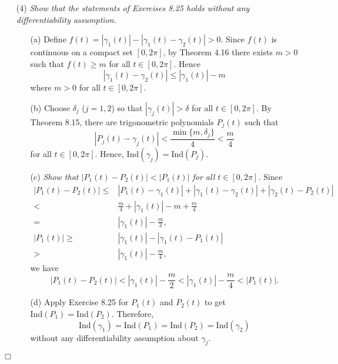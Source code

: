 \documentclass{article}
\begin{document}
\begin{enumerate}
\item[(4)]
\emph{Show that the statements of Exercises 8.25 holds
without any differentiability assumption.}
  \begin{enumerate}
  \item[(a)]
  Define $f(t) = |\gamma_1(t)| - |\gamma_1(t) - \gamma_2(t)| > 0$.
  Since $f(t)$ is continuous on a compact set $[0,2\pi]$,
  by Theorem 4.16 there exists $m > 0$ such that $f(t) \geq m$ for all $t \in [0,2\pi]$.
  Hence
  \[
    |\gamma_1(t) - \gamma_2(t)| \leq |\gamma_1(t)| - m
  \]
  where $m > 0$ for all $t \in [0,2\pi]$.

  \item[(b)]
  Choose $\delta_j$ ($j=1,2$) so that $|\gamma_j(t)| > \delta$
  for all $t \in [0,2\pi]$.
  By Theorem 8.15, there are trigonometric polynomials $P_j(t)$ such that
  \[
    |P_j(t) - \gamma_j(t)| < \frac{\min\{m, \delta_j\}}{4} < \frac{m}{4}
  \]
  for all $t \in [0,2\pi]$.
  Hence, $\mathrm{Ind}(\gamma_j) = \mathrm{Ind}(P_j)$.

  \item[(c)]
  \emph{Show that $|P_1(t)-P_2(t)| < |P_1(t)|$ for all $t \in [0,2\pi]$.}
  Since
  \begin{align*}
    |P_1(t)-P_2(t)|
    \leq& |P_1(t)-\gamma_1(t)| + |\gamma_1(t)-\gamma_2(t)| + |\gamma_2(t)-P_2(t)| \\
    <& \frac{m}{4} + |\gamma_1(t)| - m + \frac{m}{4} \\
    =& |\gamma_1(t)| - \frac{m}{2}, \\
    |P_1(t)|
    \geq& |\gamma_1(t)| - |\gamma_1(t)-P_1(t)| \\
    >& |\gamma_1(t)| - \frac{m}{4},
  \end{align*}
  we have
  \[
    |P_1(t)-P_2(t)| < |\gamma_1(t)| - \frac{m}{2} < |\gamma_1(t)| - \frac{m}{4} < |P_1(t)|.
  \]

  \item[(d)]
  Apply Exercise 8.25 for $P_1(t)$ and $P_2(t)$ to get
  $\mathrm{Ind}(P_1) = \mathrm{Ind}(P_2)$.
  Therefore,
  \[
    \mathrm{Ind}(\gamma_1) = \mathrm{Ind}(P_1) = \mathrm{Ind}(P_2) = \mathrm{Ind}(\gamma_2)
  \]
  without any differentiability assumption about $\gamma_j$.
  \end{enumerate}
\end{enumerate}
$\Box$ \\\\



\end{document}
